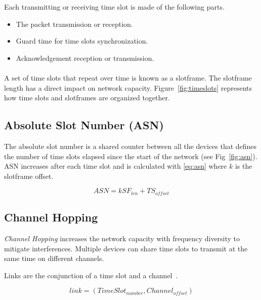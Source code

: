 Each transmitting or receiving time slot is made of the following parts.

\begin{itemize}
  \item The packet transmission or reception.
  \item Guard time for time slots synchronization.
  \item Acknowledgement reception or transmission.
\end{itemize}

\paragraph{}

A set of time slots that repeat over time is known as a slotframe.
The slotframe length has a direct impact on network capacity.
Figure~\ref{fig:timeslots} represents how time slots and slotframes are
organized together.



\subsection{Absolute Slot Number (ASN)}

The absolute slot number is a shared counter between all the devices that
defines the number of time slots elapsed since the start of the
network (see Fig~\ref{fig:asn}).
ASN increases after each time slot and is calculated with \ref{eq:asn} where $k$
is the slotframe offset.

\begin{equation}
  \label{eq:asn}
  ASN = k SF_{len} + TS_{offset}
\end{equation}



\subsection{Channel Hopping}

\emph{Channel Hopping} increases the network capacity with frequency diversity
to mitigate interferences.
Multiple devices can share time slots to transmit at the same time on different
channels.

Links are the conjunction of a time slot and a channel~\cite{Chen2013PerformanceAO}.

\begin{equation}
  \label{eq:links}
  link = (TimeSlot_{number}, Channel_{offset})
\end{equation}

